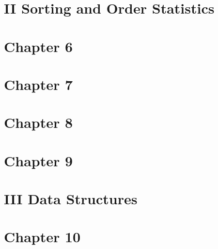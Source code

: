 \documentclass[12pt,a4paper]{article}
\begin{document}



\pagebreak


\section*{II Sorting and Order Statistics}
\pagebreak

\section*{Chapter 6}





\pagebreak

\section*{Chapter 7}








\pagebreak


\section*{Chapter 8}









\pagebreak

\section*{Chapter 9}






\pagebreak


\section*{III Data Structures}
\pagebreak


\section*{Chapter 10}
\end{document}
